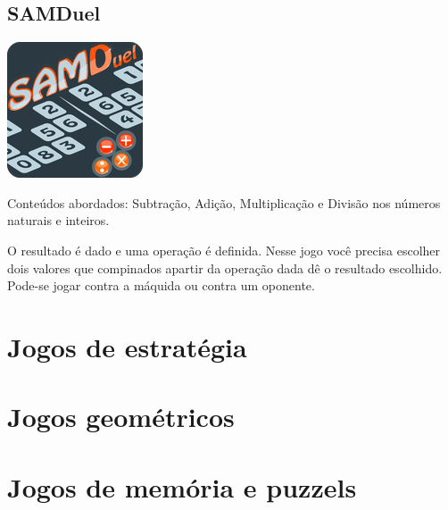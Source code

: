 \begin{multicols}{2}
\subsection{SAMDuel}

\begin{center}
\includegraphics[scale=1]{./imagens/24.png}
\end{center}

Conteúdos abordados: Subtração, Adição, Multiplicação e Divisão nos números naturais e inteiros.

O resultado é dado e uma operação é definida. Nesse jogo você precisa escolher dois valores que compinados apartir da operação dada dê o resultado escolhido. Pode-se jogar contra a máquida ou contra um oponente.

\section{Jogos de estratégia}

\section{Jogos geométricos}

\section{Jogos de memória e puzzels}

\end{multicols}

